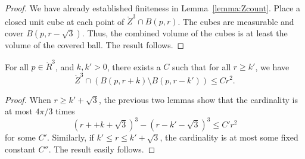 \begin{proof} We have already established finiteness in
Lemma~\ref{lemma:Zcount}.  Place a closed unit cube at each point
of $\ring{Z}^3\cap B(p,r)$.  The cubes are measurable and cover
$B(p,r-\sqrt3)$.  Thus, the combined volume of the cubes is at
least the volume of the covered ball.  The result follows.
\end{proof}

\begin{lemma}
For all $p\in\ring{R}^3$, and $k,k'>0$, there exists a $C$ such
that for all $r\ge k'$, we have
    $$
    \ring{Z}^3 \cap (B(p,r+k) \setminus B(p,r-k')) \le C r^2.
    $$
\end{lemma}

\begin{proof}  When $r \ge k'+\sqrt3$, the previous two lemmas show
that the cardinality is at most $4\pi/3$ times
    $$(r + +k + \sqrt3)^3 - (r - k' - \sqrt3)^3 \le C' r^2$$
for some $C'$.  Similarly, if $k'\le r\le k'+\sqrt3$, the
cardinality is at most some fixed constant $C''$.  The result
easily follows.
\end{proof}

